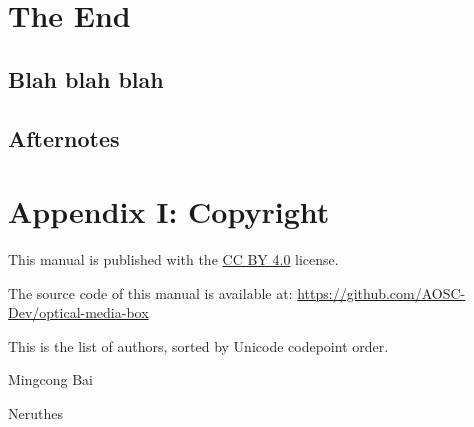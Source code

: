     \chapter{The End}
    \lipsum[1]
    
    \section{Blah blah blah}
    \lipsum[1]
    


    \section{Afternotes}
    \lipsum[1]
    
    \lipsum[1]



    \chapter{Appendix I: Copyright}

    This manual is published with the \underline{CC BY 4.0} license.

    The source code of this manual is available at:\newline
    \hspace{2em}\underline{\ttfamily\footnotesize{https://github.com/AOSC-Dev/optical-media-box}}

    \vspace{1ex}This is the list of authors, sorted by Unicode codepoint order.

    \begin{compactitem}
        \item Mingcong Bai
        \item Neruthes
    \end{compactitem}

    \pagestyle{empty}
    \cleardoublepage
